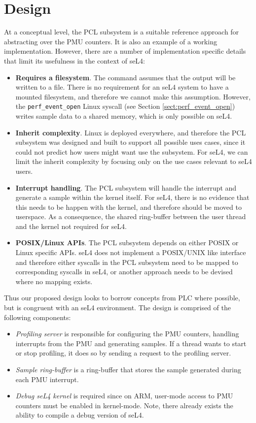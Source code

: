\section{Design}

At a conceptual level, the PCL subsystem is a suitable reference approach for abstracting over the PMU counters. It is also an example of a working implementation. However, there are a number of implementation specific details that limit its usefulness in the context of seL4:

\ssp\begin{itemize}
    \item \textbf{Requires a filesystem}. The  command assumes that the output will be written to a file. There is no requirement for an seL4 system to have a mounted filesystem, and therefore we cannot make this assumption. However, the \texttt{perf\_event\_open} Linux syscall (see Section \ref{sect:perf_event_open}) writes sample data to a shared memory, which is only possible on seL4.
    \item \textbf{Inherit complexity}. Linux is deployed everywhere, and therefore the PCL subsystem was designed and built to support all possible uses cases, since it could not predict how users might want use the subsystem. For seL4, we can limit the inherit complexity by focusing only on the use cases relevant to seL4 users.
    \item \textbf{Interrupt handling}. The PCL subsystem will handle the interrupt and generate a sample within the kernel itself. For seL4, there is no evidence that this needs to be happen with the kernel, and therefore should be moved to userspace. As a consequence, the shared ring-buffer between the user thread and the kernel not required for seL4.
    \item \textbf{POSIX/Linux APIs}. The PCL subsystem depends on either POSIX or Linux specific APIs. seL4 does not implement a POSIX/UNIX like interface and therefore either syscalls in the PCL subsystem need to be mapped to corresponding syscalls in seL4, or another approach needs to be devised where no mapping exists.
\end{itemize}\dsp

Thus our proposed design looks to borrow concepts from PLC where possible, but is congruent with an seL4 environment. The design is comprised of the following components:

\ssp\begin{itemize}
    \item \textit{Profiling server} is responsible for configuring the PMU counters, handling interrupts from the PMU and generating samples. If a thread wants to start or stop profiling, it does so by sending a request to the profiling server.
    \item \textit{Sample ring-buffer} is a ring-buffer that stores the sample generated during each PMU interrupt.
    \item \textit{Debug seL4 kernel} is required since on ARM, user-mode access to PMU counters must be enabled in kernel-mode. Note, there already exists the ability to compile a debug version of seL4.
\end{itemize}\dsp

